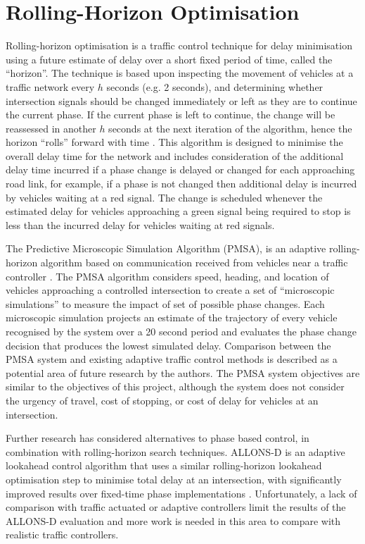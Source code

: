 \section{Rolling-Horizon Optimisation}
\label{bg:rolling-horizon}

Rolling-horizon optimisation is a traffic control technique for delay minimisation using a future estimate of delay over a short fixed period of time, called the ``horizon''. The technique is based upon inspecting the movement of vehicles at a traffic network every $h$ seconds (e.g. 2 seconds), and determining whether intersection signals should be changed immediately or left as they are to continue the current phase. If the current phase is left to continue, the change will be reassessed in another $h$ seconds at the next iteration of the algorithm, hence the horizon ``rolls'' forward with time \cite{miller1963computer}. This algorithm is designed to minimise the overall delay time for the network and includes consideration of the additional delay time incurred if a phase change is delayed or changed for each approaching road link, for example, if a phase is not changed then additional delay is incurred by vehicles waiting at a red signal. The change is scheduled whenever the estimated delay for vehicles approaching a green signal being required to stop is less than the incurred delay for vehicles waiting at red signals.

The Predictive Microscopic Simulation Algorithm (PMSA), is an adaptive rolling-horizon algorithm based on communication received from vehicles near a traffic controller \cite{smith2010intellidrive}. The PMSA algorithm considers speed, heading, and location of vehicles approaching a controlled intersection to create a set of ``microscopic simulations'' to measure the impact of set of possible phase changes. Each microscopic simulation projects an estimate of the trajectory of every vehicle recognised by the system over a 20 second period and evaluates the phase change decision that produces the lowest simulated delay. Comparison between the PMSA system and existing adaptive traffic control methods is described as a potential area of future research by the authors. The PMSA system objectives are similar to the objectives of this project, although the system does not consider the urgency of travel, cost of stopping, or cost of delay for vehicles at an intersection.

Further research has considered alternatives to phase based control, in combination with rolling-horizon search techniques.  ALLONS-D is an adaptive lookahead control algorithm that uses a similar rolling-horizon lookahead optimisation step to minimise total delay at an intersection, with significantly improved results over fixed-time phase implementations \cite{porche1996allonsd}. Unfortunately, a lack of comparison with traffic actuated or adaptive controllers limit the results of the ALLONS-D evaluation and more work is needed in this area to compare with realistic traffic controllers. 

